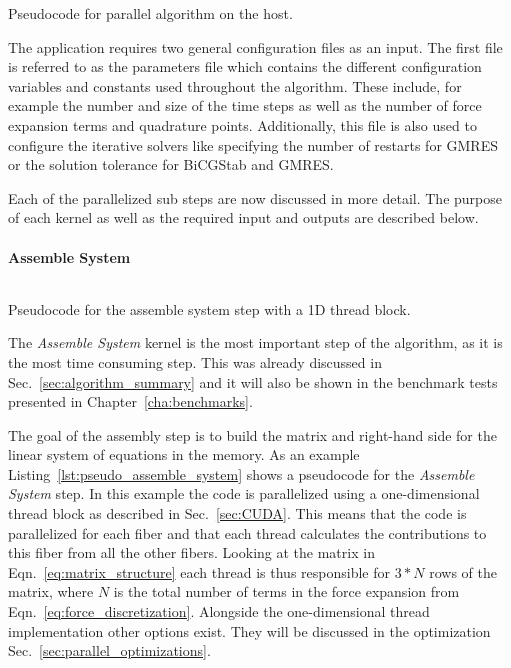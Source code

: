 \begin{listing}[!htbp]
  \centering
  \inputminted[mathescape,
    linenos,
    numbersep=5pt,
    fontsize=\footnotesize,
    frame=lines,
    framesep=2mm]{c}{lst/parallel_algorithm.lst}
  \caption{Pseudocode for parallel algorithm on the host.}
  \label{lst:pseudo_parallel_algorithm}
\end{listing}

The application requires two general configuration files as an input. The first file is referred to as the parameters file which contains the different configuration variables and constants used throughout the algorithm. These include, for example the number and size of the time steps as well as the number of force expansion terms and quadrature points. Additionally, this file is also used to configure the iterative solvers like specifying the number of restarts for GMRES or the solution tolerance for BiCGStab and GMRES.

Each of the parallelized sub steps are now discussed in more detail. The purpose of each kernel as well as the required input and outputs are described below.

\paragraph{Assemble System}

\begin{listing}[!htbp]
  \centering
  \inputminted[mathescape,
    linenos,
    numbersep=5pt,
    fontsize=\footnotesize,
    frame=lines,
    framesep=2mm]{c}{lst/assemble_system.lst}
  \caption{Pseudocode for the assemble system step with a 1D thread block.}
  \label{lst:pseudo_assemble_system}
\end{listing}

The \emph{Assemble System} kernel is the most important step of the algorithm, as it is the most time consuming step. This was already discussed in Sec.~\ref{sec:algorithm_summary} and it will also be shown in the benchmark tests presented in Chapter~\ref{cha:benchmarks}. 

The goal of the assembly step is to build the matrix and right-hand side for the linear system of equations in the memory. As an example Listing~\ref{lst:pseudo_assemble_system} shows a pseudocode for the \emph{Assemble System} step. In this example the code is parallelized using a one-dimensional thread block as described in Sec.~\ref{sec:CUDA}. This means that the code is parallelized for each fiber and that each thread calculates the contributions to this fiber from all the other fibers. Looking at the matrix in Eqn.~\eqref{eq:matrix_structure} each thread is thus responsible for $3*N$ rows of the matrix, where $N$ is the total number of terms in the force expansion from Eqn.~\eqref{eq:force_discretization}. Alongside the one-dimensional thread implementation other options exist. They will be discussed in the optimization Sec.~\ref{sec:parallel_optimizations}.

